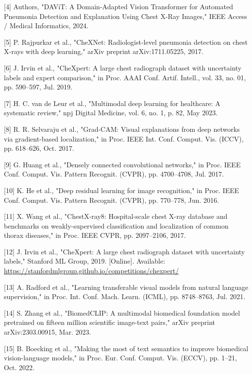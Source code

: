 \documentclass[
]{article}
\begin{document}
{[}4{]} Authors, "DAViT: A Domain-Adapted Vision Transformer for
Automated Pneumonia Detection and Explanation Using Chest X-Ray Images,"
IEEE Access / Medical Informatics, 2024.

{[}5{]} P. Rajpurkar et al., "CheXNet: Radiologist-level pneumonia
detection on chest X-rays with deep learning," arXiv preprint
arXiv:1711.05225, 2017.

{[}6{]} J. Irvin et al., "CheXpert: A large chest radiograph dataset
with uncertainty labels and expert comparison," in Proc. AAAI Conf.
Artif. Intell., vol. 33, no. 01, pp. 590--597, Jul. 2019.

{[}7{]} H. C. van de Leur et al., "Multimodal deep learning for
healthcare: A systematic review," npj Digital Medicine, vol. 6, no. 1,
p. 82, May 2023.

{[}8{]} R. R. Selvaraju et al., "Grad-CAM: Visual explanations from deep
networks via gradient-based localization," in Proc. IEEE Int. Conf.
Comput. Vis. (ICCV), pp. 618--626, Oct. 2017.

{[}9{]} G. Huang et al., "Densely connected convolutional networks," in
Proc. IEEE Conf. Comput. Vis. Pattern Recognit. (CVPR), pp. 4700--4708,
Jul. 2017.

{[}10{]} K. He et al., "Deep residual learning for image recognition,"
in Proc. IEEE Conf. Comput. Vis. Pattern Recognit. (CVPR), pp. 770--778,
Jun. 2016.

{[}11{]} X. Wang et al., "ChestX-ray8: Hospital-scale chest X-ray
database and benchmarks on weakly-supervised classification and
localization of common thorax diseases," in Proc. IEEE CVPR, pp.
2097--2106, 2017.

{[}12{]} J. Irvin et al., "CheXpert: A large chest radiograph dataset
with uncertainty labels," Stanford ML Group, 2019. {[}Online{]}.
Available: \url{https://stanfordmlgroup.github.io/competitions/chexpert/}

{[}13{]} A. Radford et al., "Learning transferable visual models from
natural language supervision," in Proc. Int. Conf. Mach. Learn. (ICML),
pp. 8748--8763, Jul. 2021.

{[}14{]} S. Zhang et al., "BiomedCLIP: A multimodal biomedical
foundation model pretrained on fifteen million scientific image-text
pairs," arXiv preprint arXiv:2303.00915, Mar. 2023.

{[}15{]} B. Boecking et al., "Making the most of text semantics to
improve biomedical vision-language models," in Proc. Eur. Conf. Comput.
Vis. (ECCV), pp. 1--21, Oct. 2022.
\end{document}
